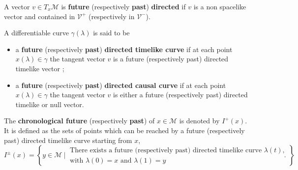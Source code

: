 \documentclass[10pt]{book}
\newcommand{\Mcal}{\mathcal{M}}
\newcommand{\Vcal}{\mathcal{V}}
\theoremstyle{break}
\newtheorem{definition}{Definition}
\begin{document}
%
%
%
%
%
%
%

A vector $v \in T_x\Mcal$ is \textbf{future} (respectively \textbf{past}) \textbf{directed} if $v$ is a non spacelike vector and contained in $\Vcal^+$ (respectively in $\Vcal^-$). 


\bigskip


A differentiable curve $\gamma(\lambda)$ is said to be 
\begin{itemize}
\item a \textbf{future} (respectively \textbf{past}) \textbf{directed timelike curve} if at each point $x(\lambda) \in \gamma$ the tangent vector $v$ is a future (respectively past) directed timelike vector ;
\item a \textbf{future} (respectively \textbf{past}) \textbf{directed causal curve} if at each point $x(\lambda) \in \gamma$ the tangent vector $v$ is either a future (respectively past) directed timelike or null vector. 
\end{itemize}

\bigskip

The \textbf{chronological future} (respectively \textbf{past}) of $x \in \Mcal$ is denoted by $I^{+}(x)$. It is defined as the sets of points which can be reached by a future (respectively past) directed timelike curve starting from $x$,
%
\begin{equation*}
I^{\pm}(x) = \left\{ y \in \Mcal \ \bigg| \ \begin{array}{l} \text{There exists a future (respectively past) directed timelike curve $\lambda(t)$,} \\ \text{with $\lambda(0)=x$ and $\lambda(1)=y$} \end{array} \ \right\}.
\end{equation*}
\end{document}
